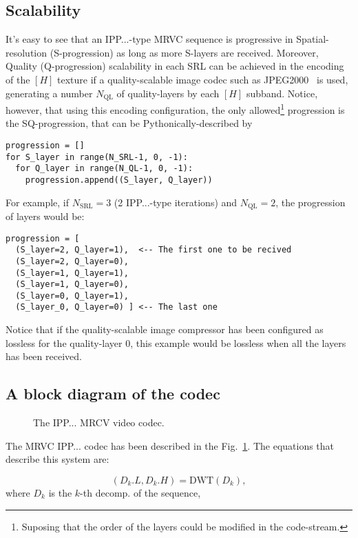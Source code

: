 \subsection{Scalability}
It's easy to see that an IPP...-type MRVC sequence is progressive in
Spatial-resolution (S-progression) as long as more S-layers are
received. Moreover, Quality (Q-progression) scalability in each SRL
can be achieved in the encoding of the $[H]$ texture if a
quality-scalable image codec such as
JPEG2000~\cite{taubman2002jpeg2000} is used, generating a number
$N_{\text{QL}}$ of quality-layers by each $[H]$ subband. Notice,
however, that using this encoding configuration, the only
allowed\footnote{Suposing that the order of the layers could be
modified in the code-stream.} progression is the SQ-progression, that
can be Pythonically-described by
\begin{verbatim}
progression = []
for S_layer in range(N_SRL-1, 0, -1):
  for Q_layer in range(N_QL-1, 0, -1):
    progression.append((S_layer, Q_layer))
\end{verbatim}

For example, if $N_{\text{SRL}}=3$ (2 IPP...-type iterations) and
$N_{\text{QL}}=2$, the progression of layers would be:
\begin{verbatim}
progression = [
  (S_layer=2, Q_layer=1),  <-- The first one to be recived
  (S_layer=2, Q_layer=0),
  (S_layer=1, Q_layer=1),
  (S_layer=1, Q_layer=0),
  (S_layer=0, Q_layer=1),
  (S_layer_0, Q_layer=0) ] <-- The last one
\end{verbatim}
Notice that if the quality-scalable image compressor has been
configured as lossless for the quality-layer 0, this example
would be lossless when all the layers has been received.

\subsection{A block diagram of the codec}
\begin{figure}
  \centering
  \caption{The IPP... MRCV video codec.}
  \label{fig:codec}
\end{figure}

The MRVC IPP... codec has been described in the
Fig.~\ref{fig:codec}. The equations that describe this system are:

\begin{equation}
  (D_k.L, D_k.H) = \text{DWT}(D_k),
  \tag{a}
\end{equation}
where $D_k$ is the $k$-th decomp. of the sequence,

